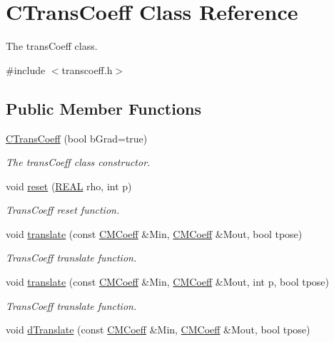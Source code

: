 \hypertarget{classCTransCoeff}{\section{C\-Trans\-Coeff Class Reference}
\label{classCTransCoeff}
}


The trans\-Coeff class.  




{\ttfamily \#include $<$transcoeff.\-h$>$}

\subsection*{Public Member Functions}
\begin{DoxyCompactItemize}
\item 
\hyperlink{classCTransCoeff_a1b4eb40fb4a4d8efb14ad684c1a169d4}{C\-Trans\-Coeff} (bool b\-Grad=true)
\begin{DoxyCompactList}\small\item\em The trans\-Coeff class constructor. \end{DoxyCompactList}\item 
void \hyperlink{classCTransCoeff_ade17444acf44e5c80f8caa9a593f03ee}{reset} (\hyperlink{util_8h_a5821460e95a0800cf9f24c38915cbbde}{R\-E\-A\-L} rho, int p)
\begin{DoxyCompactList}\small\item\em Trans\-Coeff reset function. \end{DoxyCompactList}\item 
void \hyperlink{classCTransCoeff_a0152b91eec8d84278e6432019ce4ef91}{translate} (const \hyperlink{classCMCoeff}{C\-M\-Coeff} \&Min, \hyperlink{classCMCoeff}{C\-M\-Coeff} \&Mout, bool tpose)
\begin{DoxyCompactList}\small\item\em Trans\-Coeff translate function. \end{DoxyCompactList}\item 
void \hyperlink{classCTransCoeff_a15c1d9affb86e989dc0beefa0683effb}{translate} (const \hyperlink{classCMCoeff}{C\-M\-Coeff} \&Min, \hyperlink{classCMCoeff}{C\-M\-Coeff} \&Mout, int p, bool tpose)
\begin{DoxyCompactList}\small\item\em Trans\-Coeff translate function. \end{DoxyCompactList}\item 
void \hyperlink{classCTransCoeff_a909121581454680f2b50f797f22715f0}{d\-Translate} (const \hyperlink{classCMCoeff}{C\-M\-Coeff} \&Min, \hyperlink{classCMCoeff}{C\-M\-Coeff} \&Mout, bool tpose)

\end{DoxyCompactItemize}
